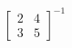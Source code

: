 \documentclass[preview]{standalone}
\begin{document}
\begin{align*}
\begin{bmatrix}  2 & 4\\ 3 & 5 \end{bmatrix}^{-1}
\end{align*}
\end{document}
